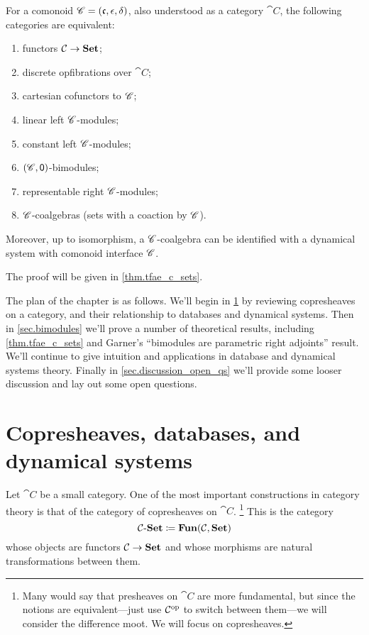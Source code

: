 \documentclass[Book-Poly]{subfiles}
\begin{document}
\begin{theorem}\label{thm.tfae_c_sets}
For a comonoid $\mathscr{C}=(\mathfrak{c},\epsilon,\delta)$, also understood as a category $\cat{C}$, the following categories are equivalent:
\begin{enumerate}
	\item functors $\mathcal{C}\to\textbf{Set}$;
	\item discrete opfibrations over $\cat{C}$;
	\item cartesian cofunctors to $\mathscr{C}$;
	\item linear left $\mathscr{C}$-modules;
	\item constant left $\mathscr{C}$-modules;
	\item $(\mathscr{C},\textsf{0})$-bimodules;
	\item representable right $\mathscr{C}$-modules;
	\item $\mathscr{C}$-coalgebras (sets with a coaction by $\mathscr{C}$).
\end{enumerate}
Moreover, up to isomorphism, a $\mathscr{C}$-coalgebra can be identified with a dynamical system with comonoid interface $\mathscr{C}$.
\end{theorem}
The proof will be given in \cref{thm.tfae_c_sets}.

The plan of the chapter is as follows. We'll begin in \cref{sec.copresheaves_data_ds} by reviewing copresheaves on a category, and their relationship to databases and dynamical systems. Then in \cref{sec.bimodules} we'll prove a number of theoretical results, including \cref{thm.tfae_c_sets} and Garner's ``bimodules are parametric right adjoints'' result. We'll continue to give intuition and applications in database and dynamical systems theory. Finally in \cref{sec.discussion_open_qs} we'll provide some looser discussion and lay out some open questions.

\section{Copresheaves, databases, and dynamical systems}\label{sec.copresheaves_data_ds}

Let $\cat{C}$ be a small category. One of the most important constructions in category theory is that of the category of copresheaves on $\cat{C}$.%
\footnote{Many would say that presheaves on $\cat{C}$ are more fundamental, but since the notions are equivalent---just use $\mathcal{C}^{\textnormal{op}}$ to switch between them---we will consider the difference moot. We will focus on copresheaves.}
This is the category
\[
\mathcal{C}\textnormal{-}\textbf{Set}\coloneqq\textbf{Fun}(\mathcal{C},\textbf{Set})
\]
whose objects are functors $\mathcal{C}\to\textbf{Set}$ and whose morphisms are natural transformations between them.
\end{document}
